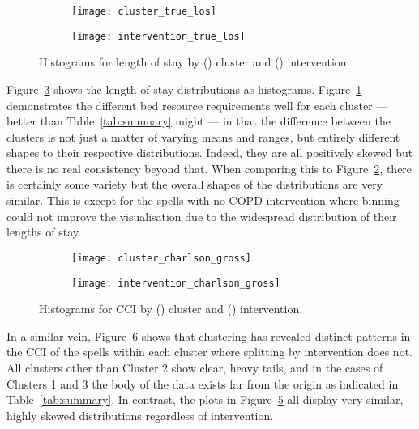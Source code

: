 \begin{figure}
    \centering
    \begin{subfigure}{.5\imgwidth}
        \texttt{[image: cluster\_true\_los]}
        \caption{}\label{fig:cluster_los}
    \end{subfigure}\hfill%
    \begin{subfigure}{.5\imgwidth}
        \texttt{[image: intervention\_true\_los]}
        \caption{}\label{fig:intervention_los}
    \end{subfigure}
    \caption{%
        Histograms for length of stay by () cluster and
        () intervention.
    }\label{fig:los}
\end{figure}

Figure~\ref{fig:los} shows the length of stay distributions as histograms.
Figure~\ref{fig:cluster_los} demonstrates the different bed resource
requirements well for each cluster --- better than Table~\ref{tab:summary}
might --- in that the difference between the clusters is not just a matter of
varying means and ranges, but entirely different shapes to their respective
distributions. Indeed, they are all positively skewed but there is no real
consistency beyond that. When comparing this to
Figure~\ref{fig:intervention_los}, there is certainly some variety but the
overall shapes of the distributions are very similar. This is except for the
spells with no COPD intervention where binning could not improve the
visualisation due to the widespread distribution of their lengths of stay.

\begin{figure}
    \centering
    \begin{subfigure}{.5\imgwidth}
        \texttt{[image: cluster\_charlson\_gross]}
        \caption{}\label{fig:cluster_charlson}
    \end{subfigure}\hfill%
    \begin{subfigure}{.5\imgwidth}
        \texttt{[image: intervention\_charlson\_gross]}
        \caption{}\label{fig:intervention_charlson}
    \end{subfigure}
    \caption{%
        Histograms for CCI by () cluster and
        () intervention.
    }\label{fig:charlson}
\end{figure}

In a similar vein, Figure~\ref{fig:charlson} shows that clustering has revealed
distinct patterns in the CCI of the spells within each cluster where splitting
by intervention does not. All clusters other than Cluster 2 show clear, heavy
tails, and in the cases of Clusters 1 and 3 the body of the data exists far from
the origin as indicated in Table~\ref{tab:summary}. In contrast, the plots in
Figure~\ref{fig:intervention_charlson} all display very similar, highly skewed
distributions regardless of intervention.

